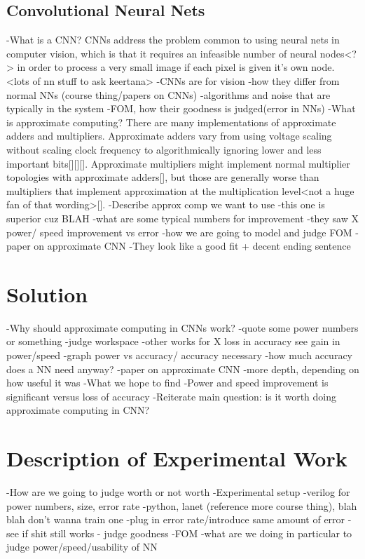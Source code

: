 \documentclass[conference]{IEEEtran}
\begin{document}
\subsection{Convolutional Neural Nets}
-What is a CNN? 
CNNs address the problem common to using neural nets in computer vision, which is that it requires an infeasible number of neural nodes<?> in order to process a very small image if each pixel is given it's own node. <lots of nn stuff to ask keertana>
	-CNNs are for vision
	-how they differ from normal NNs (course thing/papers on CNNs)
-algorithms and noise that are typically in the system
-FOM, how their goodness is judged(error in NNs)
-What is approximate computing?
There are many implementations of approximate adders and multipliers. Approximate adders vary from using voltage scaling without scaling clock frequency to algorithmically ignoring lower and less important bits[][][]. Approximate multipliers might implement normal multiplier topologies with approximate adders[], but those are generally worse than multipliers that implement approximation at the multiplication level<not a huge fan of that wording>[].
	-Describe approx comp we want to use
		-this one is superior cuz BLAH
	-what are some typical numbers for improvement
		-they saw X power/ speed improvement vs error
	-how we are going to model and judge FOM
-paper on approximate CNN
-They look like a good fit + decent ending sentence

\section{Solution}
-Why should approximate computing in CNNs work?
	-quote some power numbers or something
-judge workspace
		-other works for X loss in accuracy see gain in power/speed
		-graph power vs accuracy/ accuracy necessary
			-how much accuracy does a NN need anyway?
-paper on approximate CNN
	-more depth, depending on how useful it was
-What we hope to find
	-Power and speed improvement is significant versus loss of accuracy
	-Reiterate main question: is it worth doing approximate computing in CNN?

\section{Description of Experimental Work}
-How are we going to judge worth or not worth
-Experimental setup
	-verilog for power numbers, size, error rate
-python, lanet (reference more course thing), blah blah don’t wanna train one
	-plug in error rate/introduce same amount of error
-see if shit still works
	- judge goodness
-FOM
	-what are we doing in particular to judge power/speed/usability of NN
\end{document}
